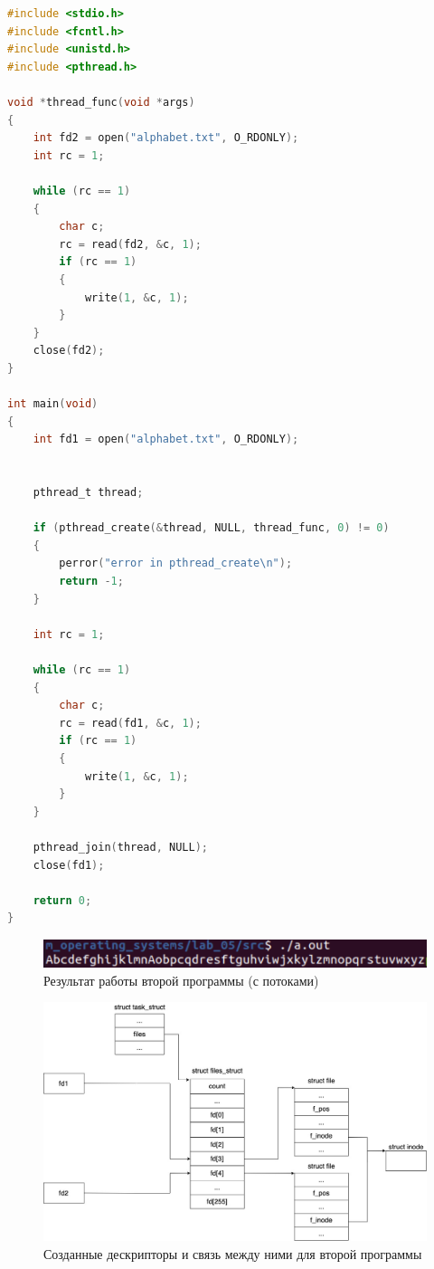 \documentclass[12pt]{report}
\begin{document}
\begin{lstlisting}[language=c, label=p2thread, caption=Вторая программа (с потоками)]
#include <stdio.h>
#include <fcntl.h>
#include <unistd.h>
#include <pthread.h>

void *thread_func(void *args)
{
    int fd2 = open("alphabet.txt", O_RDONLY);
    int rc = 1;

    while (rc == 1)
    {
        char c;
        rc = read(fd2, &c, 1);
        if (rc == 1)
        {
            write(1, &c, 1);
        }
    }
    close(fd2);
}

int main(void)
{
    int fd1 = open("alphabet.txt", O_RDONLY);
    

    pthread_t thread;

    if (pthread_create(&thread, NULL, thread_func, 0) != 0)
	{
		perror("error in pthread_create\n");
		return -1;
	}

    int rc = 1;

    while (rc == 1)
    {
        char c;
        rc = read(fd1, &c, 1);
        if (rc == 1)
        {
            write(1, &c, 1);
        }
    }

    pthread_join(thread, NULL);
    close(fd1);

    return 0;
}

\end{lstlisting}



\begin{figure}[H]
	\centering
	\includegraphics[scale=1]{img/prog_02_thread.png}
	\caption{Результат работы второй программы (с потоками)}
	\label{fig:prog_02_thread}
\end{figure}


\begin{figure}[H]
	\centering
	\includegraphics[scale=0.4]{img/prog_02_schema.jpg}
	\caption{Созданные дескрипторы и связь между ними для второй программы}
	\label{fig:prog_02_schema}
\end{figure}
\end{document}
